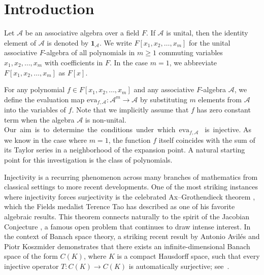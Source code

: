 \documentclass{amsart}
\theoremstyle{definition}
\begin{document}
	\begin{abstract}
		We explore the injectivity of the evaluation map \( \mathrm{eva}_{f,\mathcal{A}} : \mathcal{A}^m \to \mathcal{A} \), where \( \mathcal{A} \) is an associative algebra over a field \( F \), and \( f \) is a  polynomial in \( m \geq 1 \) variables with coefficients in $F$.  Our investigation reveals that injectivity is possible only when  \( m = 1 \) and \( f \) has degree one; for functions in two or more variables, such injectivity is impossible.
	\end{abstract}
	
	\section{Introduction}
	
	Let $\mathcal{A}$ be an  associative algebra over a field $F$. If $\mathcal{A}$ is unital, then the identity element of $\mathcal{A}$ is denoted by $\mathbf{1}_{\mathcal{A}}$. 	We write $F[x_1, x_2, \ldots, x_m] $ for the unital associative $F$-algebra of all polynomials in \( m \geq1 \) commuting variables $x_1, x_2, \ldots, x_m$ with coefficients in \( F \). In the case $m=1$, we abbreviate $F[x_1, x_2, \dots, x_m]$ as $F[x]$.
	
	For any polynomial \( f \in F[x_1, x_2, \ldots, x_m] \) and any associative \( F \)-algebra \( \mathcal{A} \), we define the evaluation map \( \mathrm{eva}_{f,\mathcal{A}} : \mathcal{A}^m \to \mathcal{A} \) by substituting \( m \) elements from \( \mathcal{A} \) into the variables of \( f \). Note that we implicitly assume that \( f \) has zero constant term when the algebra \( \mathcal{A} \) is non-unital.  Our aim is to determine the conditions under which $\mathrm{eva}_{f, \mathcal{A}}$  is injective. As we know in the case where $m=1$, the function $f$ itself coincides with the sum of its Taylor series in a neighborhood of the expansion point.	A natural starting point for this investigation is the class of polynomials. 
	
	Injectivity is a recurring phenomenon across many branches of mathematics from classical settings to more recent developments. One of the most striking instances where injectivity forces surjectivity is the celebrated Ax–Grothendieck theorem \cite{Pa_Ax_68,Pa_Grothendieck_66}, which the Fields medalist Terence Tao has described as one of his favorite algebraic results. This theorem connects naturally to the spirit of the Jacobian Conjecture \cite{Bo_Es_00}, a famous open problem that continues to draw intense interest.	 In the context of Banach space theory, a striking recent result by Antonio Avilés and Piotr Koszmider demonstrates that there exists an infinite-dimensional Banach space of the form \( C(K) \), where $K$ is a compact Hausdorff space, such that every injective operator \( T: C(K) \to C(K) \) is automatically surjective; see~\cite{Pa_Av_13}.
	
\end{document}
